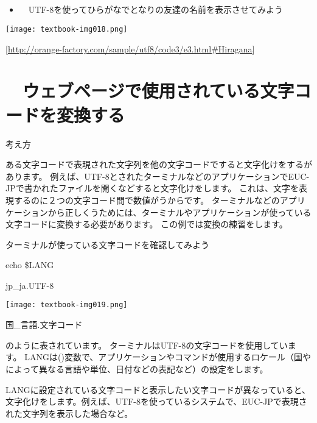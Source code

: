 \subsection*{\theQuestion\label{Q:friendNameUTF8}}
\begin{itemize}
  \item　UTF-8を使ってひらがなでとなりの友達の名前を表示させてみよう
\end{itemize}

\begin{center}
  \texttt{[image: textbook-img018.png]}
\end{center}

[\url{http://orange-factory.com/sample/utf8/code3/e3.html#Hiragana}]


\clearpage
\section{\theExercise　ウェブページで使用されている文字コードを変換する}
\addtocounter{Exercise}{-1}\label{E:iconv}
\noindent 考え方

ある文字コードで表現された文字列を他の文字コードですると文字化けをするがあります。
例えば、UTF-8とされたターミナルなどのアプリケーションでEUC-JPで書かれたファイルを開くなどすると文字化けをします。
これは、文字を表現するのに２つの文字コード間で数値がうからです。
ターミナルなどのアプリケーションから正しくうためには、ターミナルやアプリケーションが使っている文字コードに変換する必要があります。
この例では変換の練習をします。

ターミナルが使っている文字コードを確認してみよう

echo \$LANG

jp\_ja.UTF-8

\begin{center}
  \texttt{[image: textbook-img019.png]}
\end{center}
国\_言語.文字コード

のように表されています。
ターミナルはUTF-8の文字コードを使用しています。
LANGは()変数で、アプリケーションやコマンドが使用するロケール（国やによって異なる言語や単位、日付などの表記など）の設定をします。

LANGに設定されている文字コードと表示したい文字コードが異なっていると、文字化けをします。例えば、UTF-8を使っているシステムで、EUC-JPで表現された文字列を表示した場合など。

